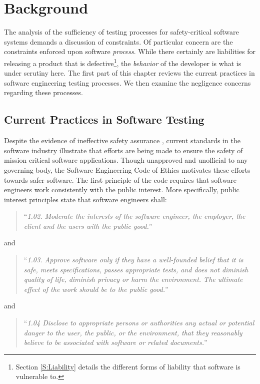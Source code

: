 \chapter{Background}\label{C:Background}
The analysis of the sufficiency of testing processes for safety-critical
software systems demands a discussion of constraints. Of particular concern are
the constraints enforced upon software \textit{process}. While there certainly
are liabilities for releasing a product that is defective\footnote{Section 
\ref{S:Liability} details the different forms of liability that software is
vulnerable to.}, the \textit{behavior} of the developer is what is under
scrutiny here. The first part of this chapter reviews the current practices in
software engineering testing processes. We then examine the negligence concerns
regarding these processes.

\section{Current Practices in Software Testing}
Despite the evidence of ineffective safety assurance \cite{Leveson93,Maisel05},
current standards in the software industry illustrate that efforts are being
made to ensure the safety of mission critical software applications. Though
unapproved and unofficial to any governing body, the Software Engineering Code
of Ethics motivates these efforts towards safer software. The first principle of
the code requires that software engineers work consistently with the public
interest. More specifically, public interest principles state that software
engineers shall: 

\begin{quote}
``\textit{1.02. Moderate the interests of the software engineer, the
employer, the client and the users with the public good.}''\cite{SECODE}
\end{quote}
\begin{center}and\end{center}
\begin{quote}
``\textit{1.03. Approve software only if they have a well-founded belief that it
is safe, meets specifications, passes appropriate tests, and does not diminish
quality of life, diminish privacy or harm the environment. The ultimate effect
of the work should be to the public good.}''\cite{SECODE}
\end{quote}
\begin{center}and\end{center}
\begin{quote}
``\textit{1.04 Disclose to appropriate persons or authorities any actual or
potential danger to the user, the public, or the environment, that they
reasonably believe to be associated with software or related
documents.}''\cite{SECODE}
\end{quote}

